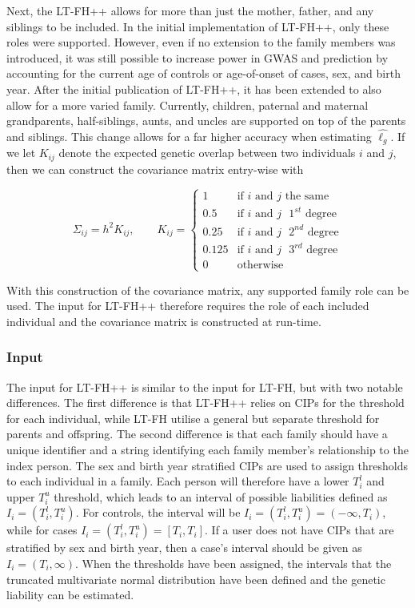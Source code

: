 Next, the LT-FH++ allows for more than just the mother, father, and any siblings to be included. In the initial implementation of LT-FH++, only these roles were supported. However, even if no extension to the family members was introduced, it was still possible to increase power in GWAS and prediction by accounting for the current age of controls or age-of-onset of cases, sex, and birth year. After the initial publication of LT-FH++, it has been extended to also allow for a more varied family. Currently, children, paternal and maternal grandparents, half-siblings, aunts, and uncles are supported on top of the parents and siblings. This change allows for a far higher accuracy when estimating $ \hat{\ell_g} $. If we let $ K_{ij} $ denote the expected genetic overlap between two individuals $ i $ and $ j $, then we can construct the covariance matrix entry-wise with 

\begin{equation*}
\Sigma_{ij} = h^2K_{ij}, \qquad K_{ij} = 
\begin{cases} 
1 		& \text{if } i \text{ and } j \text{ the same} \\
0.5 	& \text{if } i \text{ and } j \text{ $1^{st}$ degree} \\
0.25 	& \text{if } i \text{ and } j \text{ $2^{nd}$ degree} \\ 
0.125 	& \text{if } i \text{ and } j \text{ $3^{rd}$ degree}  \\
0 		& \text{otherwise}
\end{cases}
\end{equation*}

With this construction of the covariance matrix, any supported family role can be used. The input for LT-FH++ therefore requires the role of each included individual and the covariance matrix is constructed at run-time. 

\subsubsection{Input}
The input for LT-FH++ is similar to the input for LT-FH, but with two notable differences. The first difference is that LT-FH++ relies on CIPs for the threshold for each individual, while LT-FH utilise a general but separate threshold for parents and offspring. The second difference is that each family should have a unique identifier and a string identifying each family member's relationship to the index person. The sex and birth year stratified CIPs are used to assign thresholds to each individual in a family. Each person will therefore have a lower $ T_i^l $ and upper $ T_i^u $ threshold, which leads to an interval of possible liabilities defined as $ I_i = (T_i^l, T_i^u) $. For controls, the interval will be $ I_i = (T_i^l,T_i^u) = (-\infty, T_i) $, while for cases $ I_i = (T_i^l,T_i^u) = [T_i,T_i] $. If a user does not have CIPs that are stratified by sex and birth year, then a case's interval should be given as $ I_i = (T_i, \infty) $. When the thresholds have been assigned, the intervals that the truncated multivariate normal distribution have been defined and the genetic liability can be estimated. 


